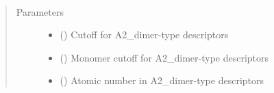 \documentclass[letterpaper,10pt,english]{sphinxmanual}
\begin{document}
\begin{fulllineitems}
\label{\detokenize{descriptors:gap.descriptors.A2_dimer}}~\begin{quote}\begin{description}
\item[{Parameters}] \leavevmode\begin{itemize}
\item {} 
 () \textendash{} Cutoff for A2\_dimer-type descriptors

\item {} 
 () \textendash{} Monomer cutoff for A2\_dimer-type descriptors

\item {} 
 () \textendash{} Atomic number in A2\_dimer-type descriptors

\end{itemize}

\end{description}\end{quote}

\end{fulllineitems}

\end{document}
